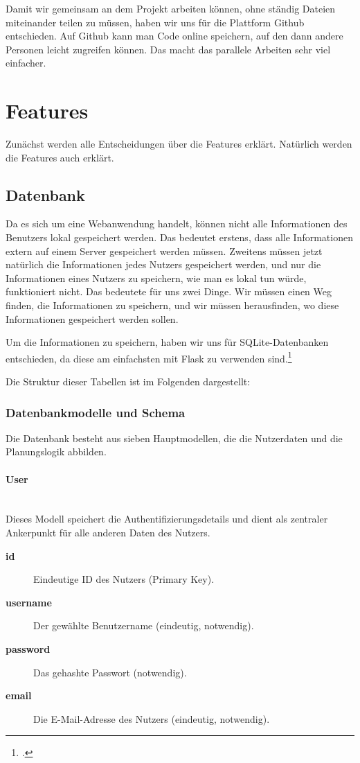 \documentclass[12pt,a4paper]{report}
\newcommand{\myparagraph}[1]{\paragraph{#1}\mbox{}\\}
\begin{document}
Damit wir gemeinsam an dem Projekt arbeiten können, ohne ständig Dateien miteinander teilen zu müssen, haben wir uns für die Plattform Github entschieden. Auf Github kann man Code online speichern, auf den dann andere Personen leicht zugreifen können. Das macht das parallele Arbeiten sehr viel einfacher. 


\section{Features}
Zunächst werden alle Entscheidungen über die Features erklärt. Natürlich werden die Features auch erklärt.

\subsection{Datenbank}
Da es sich um eine Webanwendung handelt, können nicht alle Informationen des Benutzers lokal gespeichert werden. Das bedeutet erstens, dass alle Informationen extern auf einem Server gespeichert werden müssen. Zweitens müssen jetzt natürlich die Informationen jedes Nutzers gespeichert werden, und nur die Informationen eines Nutzers zu speichern, wie man es lokal tun würde, funktioniert nicht. Das bedeutete für uns zwei Dinge. Wir müssen einen Weg finden, die Informationen zu speichern, und wir müssen herausfinden, wo diese Informationen gespeichert werden sollen.

Um die Informationen zu speichern, haben wir uns für SQLite-Datenbanken entschieden, da diese am einfachsten mit Flask zu verwenden sind.\footcite{flask_database_tutorial}

Die Struktur dieser Tabellen ist im Folgenden dargestellt:

\subsubsection{Datenbankmodelle und Schema}

Die Datenbank besteht aus sieben Hauptmodellen, die die Nutzerdaten und die Planungslogik abbilden.

\myparagraph{User}
Dieses Modell speichert die Authentifizierungsdetails und dient als zentraler Ankerpunkt für alle anderen Daten des Nutzers.
\begin{description}
    \item[\textbf{id}] Eindeutige ID des Nutzers (Primary Key).
    \item[\textbf{username}] Der gewählte Benutzername (eindeutig, notwendig).
    \item[\textbf{password}] Das gehashte Passwort (notwendig).
    \item[\textbf{email}] Die E-Mail-Adresse des Nutzers (eindeutig, notwendig).
\end{description}
\end{document}
